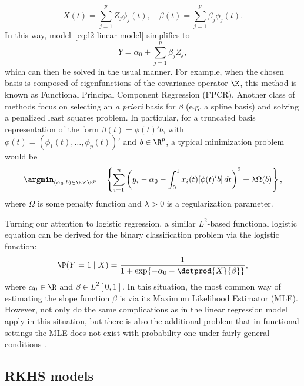 \[
  X(t)=\sum_{j=1}^p Z_j \phi_j(t), \quad \beta(t) = \sum_{j=1}^p \beta_j \phi_j(t).
\]
In this way, model~\eqref{eq:l2-linear-model} simplifies to
\[
Y = \alpha_0 + \sum_{j=1}^p \beta_j Z_j,
\]
which can then be solved in the usual manner. For example, when the chosen basis is composed of eigenfunctions of the covariance operator \(\K\), this method is known as Functional Principal Component Regression (FPCR). Another class of methods focus on selecting an \textit{a priori} basis for \(\beta\) (e.g. a spline basis) and solving a penalized least squares problem. In particular, for a truncated basis representation of the form \(\beta(t)=\phi(t)'b\), with \(\phi(t)=(\phi_1(t), \dots, \phi_p(t))'\) and \(b\in\R^p\), a typical minimization problem would be
\[
\argmin_{(\alpha_0, b)\in\R\times\R^p} \ \ \ \left\{ \sum_{i=1}^n \left( y_i - \alpha_0 - \int_0^1 x_i(t)[\phi(t)'b]\, dt\right)^2 + \lambda \Omega(b) \right\},
\]
where \(\Omega\) is some penalty function and \(\lambda>0\) is a regularization parameter.

Turning our attention to logistic regression, a similar \(L^2\)-based functional logistic equation can be derived for the binary classification problem via the logistic function:
\begin{equation}\label{eq:l2-logistic-model}
  \P(Y=1 \mid X) = \frac{1}{1 + \exp\{-\alpha_0 - \dotprod{X}{\beta}\}},
\end{equation}
where \(\alpha_0 \in \R\) and \(\beta \in L^2[0, 1]\). In this situation, the most common way of estimating the slope function \(\beta\) is via its Maximum Likelihood Estimator (MLE). However, not only do the same complications as in the linear regression model apply in this situation, but there is also the additional problem that in functional settings the MLE does not exist with probability one under fairly general conditions \citep[see][]{berrendero2018functional}.

\subsection*{RKHS models}

